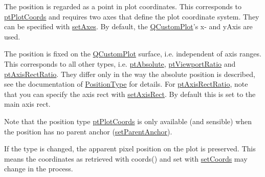 \begin{DoxyItemize}
\item \-The position is regarded as a point in plot coordinates. \-This corresponds to \hyperlink{classQCPItemPosition_aad9936c22bf43e3d358552f6e86dbdc8ad5ffb8dc99ad73263f7010c77342294c}{pt\-Plot\-Coords} and requires two axes that define the plot coordinate system. \-They can be specified with \hyperlink{classQCPItemPosition_a2185f45c75ac8cb9be89daeaaad50e37}{set\-Axes}. \-By default, the \hyperlink{classQCustomPlot}{\-Q\-Custom\-Plot}'s x-\/ and y\-Axis are used.\end{DoxyItemize}
\begin{DoxyItemize}
\item \-The position is fixed on the \hyperlink{classQCustomPlot}{\-Q\-Custom\-Plot} surface, i.\-e. independent of axis ranges. \-This corresponds to all other types, i.\-e. \hyperlink{classQCPItemPosition_aad9936c22bf43e3d358552f6e86dbdc8a564f5e53e550ead1ec5fc7fc7d0b73e0}{pt\-Absolute}, \hyperlink{classQCPItemPosition_aad9936c22bf43e3d358552f6e86dbdc8ac7d6aa89ceacb39658b0d6da061c789a}{pt\-Viewport\-Ratio} and \hyperlink{classQCPItemPosition_aad9936c22bf43e3d358552f6e86dbdc8a01080fd00eaf09fa238ef6b73bbfef75}{pt\-Axis\-Rect\-Ratio}. \-They differ only in the way the absolute position is described, see the documentation of \hyperlink{classQCPItemPosition_aad9936c22bf43e3d358552f6e86dbdc8}{\-Position\-Type} for details. \-For \hyperlink{classQCPItemPosition_aad9936c22bf43e3d358552f6e86dbdc8a01080fd00eaf09fa238ef6b73bbfef75}{pt\-Axis\-Rect\-Ratio}, note that you can specify the axis rect with \hyperlink{classQCPItemPosition_a0cd9b326fb324710169e92e8ca0041c2}{set\-Axis\-Rect}. \-By default this is set to the main axis rect.\end{DoxyItemize}
\-Note that the position type \hyperlink{classQCPItemPosition_aad9936c22bf43e3d358552f6e86dbdc8ad5ffb8dc99ad73263f7010c77342294c}{pt\-Plot\-Coords} is only available (and sensible) when the position has no parent anchor (\hyperlink{classQCPItemPosition_ac094d67a95d2dceafa0d50b9db3a7e51}{set\-Parent\-Anchor}).

\-If the type is changed, the apparent pixel position on the plot is preserved. \-This means the coordinates as retrieved with coords() and set with \hyperlink{classQCPItemPosition_aa988ba4e87ab684c9021017dcaba945f}{set\-Coords} may change in the process.

